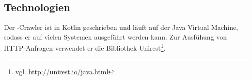\subsection{Technologien}
    Der {\wordpress}-Crawler ist in Kotlin geschrieben und läuft auf der Java Virtual Machine,
    sodass er auf vielen Systemen ausgeführt werden kann.
    Zur Ausfühung von HTTP-Anfragen verwendet er die Bibliothek
    Unirest\footnote{vgl. \url{http://unirest.io/java.html}}.